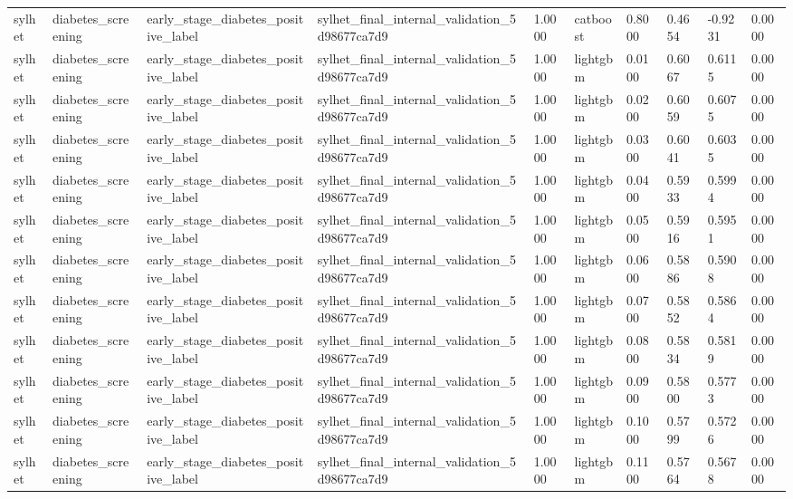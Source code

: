 \begin{tabular}{llllllllll}
sylhet & diabetes\_screening & early\_stage\_diabetes\_positive\_label & sylhet\_final\_internal\_validation\_5d98677ca7d9 & 1.0000 & catboost & 0.8000 & 0.4654 & -0.9231 & 0.0000 \\
sylhet & diabetes\_screening & early\_stage\_diabetes\_positive\_label & sylhet\_final\_internal\_validation\_5d98677ca7d9 & 1.0000 & lightgbm & 0.0100 & 0.6067 & 0.6115 & 0.0000 \\
sylhet & diabetes\_screening & early\_stage\_diabetes\_positive\_label & sylhet\_final\_internal\_validation\_5d98677ca7d9 & 1.0000 & lightgbm & 0.0200 & 0.6059 & 0.6075 & 0.0000 \\
sylhet & diabetes\_screening & early\_stage\_diabetes\_positive\_label & sylhet\_final\_internal\_validation\_5d98677ca7d9 & 1.0000 & lightgbm & 0.0300 & 0.6041 & 0.6035 & 0.0000 \\
sylhet & diabetes\_screening & early\_stage\_diabetes\_positive\_label & sylhet\_final\_internal\_validation\_5d98677ca7d9 & 1.0000 & lightgbm & 0.0400 & 0.5933 & 0.5994 & 0.0000 \\
sylhet & diabetes\_screening & early\_stage\_diabetes\_positive\_label & sylhet\_final\_internal\_validation\_5d98677ca7d9 & 1.0000 & lightgbm & 0.0500 & 0.5916 & 0.5951 & 0.0000 \\
sylhet & diabetes\_screening & early\_stage\_diabetes\_positive\_label & sylhet\_final\_internal\_validation\_5d98677ca7d9 & 1.0000 & lightgbm & 0.0600 & 0.5886 & 0.5908 & 0.0000 \\
sylhet & diabetes\_screening & early\_stage\_diabetes\_positive\_label & sylhet\_final\_internal\_validation\_5d98677ca7d9 & 1.0000 & lightgbm & 0.0700 & 0.5852 & 0.5864 & 0.0000 \\
sylhet & diabetes\_screening & early\_stage\_diabetes\_positive\_label & sylhet\_final\_internal\_validation\_5d98677ca7d9 & 1.0000 & lightgbm & 0.0800 & 0.5834 & 0.5819 & 0.0000 \\
sylhet & diabetes\_screening & early\_stage\_diabetes\_positive\_label & sylhet\_final\_internal\_validation\_5d98677ca7d9 & 1.0000 & lightgbm & 0.0900 & 0.5800 & 0.5773 & 0.0000 \\
sylhet & diabetes\_screening & early\_stage\_diabetes\_positive\_label & sylhet\_final\_internal\_validation\_5d98677ca7d9 & 1.0000 & lightgbm & 0.1000 & 0.5799 & 0.5726 & 0.0000 \\
sylhet & diabetes\_screening & early\_stage\_diabetes\_positive\_label & sylhet\_final\_internal\_validation\_5d98677ca7d9 & 1.0000 & lightgbm & 0.1100 & 0.5764 & 0.5678 & 0.0000 \\

\end{tabular}
